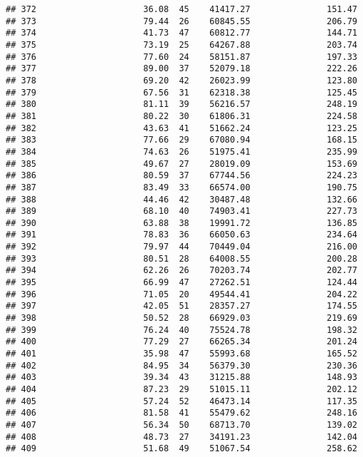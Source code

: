 \documentclass[
]{article}
\begin{document}
\begin{verbatim}
## 372                     36.08  45    41417.27               151.47
## 373                     79.44  26    60845.55               206.79
## 374                     41.73  47    60812.77               144.71
## 375                     73.19  25    64267.88               203.74
## 376                     77.60  24    58151.87               197.33
## 377                     89.00  37    52079.18               222.26
## 378                     69.20  42    26023.99               123.80
## 379                     67.56  31    62318.38               125.45
## 380                     81.11  39    56216.57               248.19
## 381                     80.22  30    61806.31               224.58
## 382                     43.63  41    51662.24               123.25
## 383                     77.66  29    67080.94               168.15
## 384                     74.63  26    51975.41               235.99
## 385                     49.67  27    28019.09               153.69
## 386                     80.59  37    67744.56               224.23
## 387                     83.49  33    66574.00               190.75
## 388                     44.46  42    30487.48               132.66
## 389                     68.10  40    74903.41               227.73
## 390                     63.88  38    19991.72               136.85
## 391                     78.83  36    66050.63               234.64
## 392                     79.97  44    70449.04               216.00
## 393                     80.51  28    64008.55               200.28
## 394                     62.26  26    70203.74               202.77
## 395                     66.99  47    27262.51               124.44
## 396                     71.05  20    49544.41               204.22
## 397                     42.05  51    28357.27               174.55
## 398                     50.52  28    66929.03               219.69
## 399                     76.24  40    75524.78               198.32
## 400                     77.29  27    66265.34               201.24
## 401                     35.98  47    55993.68               165.52
## 402                     84.95  34    56379.30               230.36
## 403                     39.34  43    31215.88               148.93
## 404                     87.23  29    51015.11               202.12
## 405                     57.24  52    46473.14               117.35
## 406                     81.58  41    55479.62               248.16
## 407                     56.34  50    68713.70               139.02
## 408                     48.73  27    34191.23               142.04
## 409                     51.68  49    51067.54               258.62

\end{verbatim}
\end{document}
